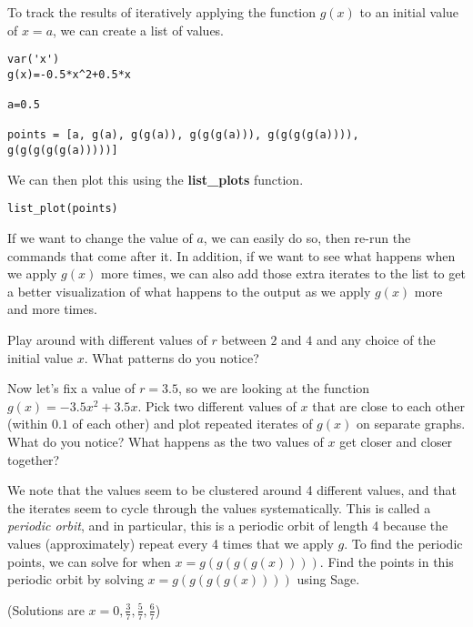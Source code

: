 To track the results of iteratively applying the function $g(x)$ to an initial
value of $x=a$, we can create a list of values.

\begin{verbatim}
var('x')
g(x)=-0.5*x^2+0.5*x

a=0.5

points = [a, g(a), g(g(a)), g(g(g(a))), g(g(g(g(a)))), g(g(g(g(g(a)))))]
\end{verbatim}

We can then plot this using the \textbf{list\_plots} function.

\begin{verbatim}
list_plot(points)
\end{verbatim}

If we want to change the value of $a$, we can easily do so, then re-run
the commands that come after it. In addition, if we want to see what
happens when we apply $g(x)$ more times, we can also add those
extra iterates to the list to get a better visualization of what happens
to the output as we apply $g(x)$ more and more times.

Play around with different values of $r$ between $2$ and $4$ and any
choice of the initial value $x$. What patterns do you notice?

Now let's fix a value of $r=3.5$, so we are looking at the function
$g(x)=-3.5x^2+3.5x$. Pick two different values of $x$ that are close to each other 
(within $0.1$ of each other) and plot repeated iterates of $g(x)$ on separate
graphs. What do you notice?
What happens as the two values of $x$ get closer and closer together?

We note that the values seem to be clustered around 4 different values,
and that the iterates seem to cycle through the values systematically. This is called
a \textit{periodic orbit}, and in particular, this is a periodic orbit of length 4 because
the values (approximately) repeat every 4 times that we apply $g$. To find
the periodic points, we can solve for when $x=g(g(g(g(x))))$. Find the points
in this periodic orbit by solving $x=g(g(g(g(x))))$ using Sage.

(Solutions are $x=0, \frac{3}{7}, \frac{5}{7}, \frac{6}{7}$)

